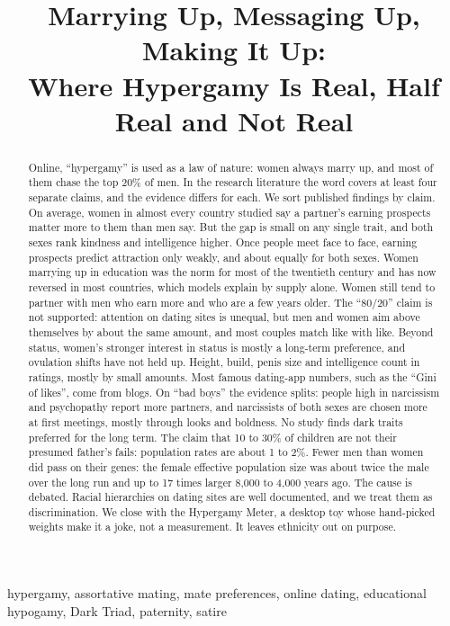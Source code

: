 \documentclass[conference,a4paper]{IEEEtran}
\title{Marrying Up, Messaging Up, Making It Up:\\ Where Hypergamy Is Real, Half Real and Not Real}
\author{\IEEEauthorblockN{Umay~\c{S}aml\i{}}
\IEEEauthorblockA{\textit{Independent researcher}\\
samliumay965@gmail.com}}
\begin{document}
\maketitle

\begin{abstract}
Online, ``hypergamy'' is used as a law of nature: women always marry up, and most of them chase the top 20\% of men. In the research literature the word covers at least four separate claims, and the evidence differs for each. We sort published findings by claim. On average, women in almost every country studied say a partner's earning prospects matter more to them than men say. But the gap is small on any single trait, and both sexes rank kindness and intelligence higher. Once people meet face to face, earning prospects predict attraction only weakly, and about equally for both sexes. Women marrying up in education was the norm for most of the twentieth century and has now reversed in most countries, which models explain by supply alone. Women still tend to partner with men who earn more and who are a few years older. The ``80/20'' claim is not supported: attention on dating sites is unequal, but men and women aim above themselves by about the same amount, and most couples match like with like. Beyond status, women's stronger interest in status is mostly a long-term preference, and ovulation shifts have not held up. Height, build, penis size and intelligence count in ratings, mostly by small amounts. Most famous dating-app numbers, such as the ``Gini of likes'', come from blogs. On ``bad boys'' the evidence splits: people high in narcissism and psychopathy report more partners, and narcissists of both sexes are chosen more at first meetings, mostly through looks and boldness. No study finds dark traits preferred for the long term. The claim that 10 to 30\% of children are not their presumed father's fails: population rates are about 1 to 2\%. Fewer men than women did pass on their genes: the female effective population size was about twice the male over the long run and up to 17 times larger 8,000 to 4,000 years ago. The cause is debated. Racial hierarchies on dating sites are well documented, and we treat them as discrimination. We close with the Hypergamy Meter, a desktop toy whose hand-picked weights make it a joke, not a measurement. It leaves ethnicity out on purpose.
\end{abstract}

\begin{IEEEkeywords}
hypergamy, assortative mating, mate preferences, online dating, educational hypogamy, Dark Triad, paternity, satire
\end{IEEEkeywords}
\end{document}
